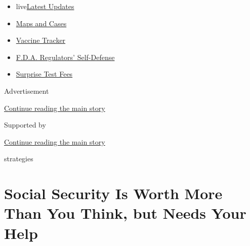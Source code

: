 \begin{itemize}
\tightlist
\item
  live\href{https://www.nytimes3xbfgragh.onion/2020/09/12/world/covid-19-coronavirus.html?name=styln-coronavirus-markets\&region=TOP_BANNER\&block=storyline_menu_recirc\&action=click\&pgtype=Article\&impression_id=034776d0-f52d-11ea-85d5-a5147cba864a\&variant=undefined}{Latest
  Updates}
\item
  \href{https://www.nytimes3xbfgragh.onion/interactive/2020/us/coronavirus-us-cases.html?name=styln-coronavirus-markets\&region=TOP_BANNER\&block=storyline_menu_recirc\&action=click\&pgtype=Article\&impression_id=034776d1-f52d-11ea-85d5-a5147cba864a\&variant=undefined}{Maps
  and Cases}
\item
  \href{https://www.nytimes3xbfgragh.onion/interactive/2020/science/coronavirus-vaccine-tracker.html?name=styln-coronavirus-markets\&region=TOP_BANNER\&block=storyline_menu_recirc\&action=click\&pgtype=Article\&impression_id=034776d2-f52d-11ea-85d5-a5147cba864a\&variant=undefined}{Vaccine
  Tracker}
\item
  \href{https://www.nytimes3xbfgragh.onion/2020/09/10/us/politics/fda-coronavirus-vaccine.html?name=styln-coronavirus-markets\&region=TOP_BANNER\&block=storyline_menu_recirc\&action=click\&pgtype=Article\&impression_id=034776d3-f52d-11ea-85d5-a5147cba864a\&variant=undefined}{F.D.A.
  Regulators' Self-Defense}
\item
  \href{https://www.nytimes3xbfgragh.onion/2020/09/09/upshot/coronavirus-surprise-test-fees.html?name=styln-coronavirus-markets\&region=TOP_BANNER\&block=storyline_menu_recirc\&action=click\&pgtype=Article\&impression_id=034776d4-f52d-11ea-85d5-a5147cba864a\&variant=undefined}{Surprise
  Test Fees}
\end{itemize}

Advertisement

\protect\hyperlink{after-top}{Continue reading the main story}

Supported by

\protect\hyperlink{after-sponsor}{Continue reading the main story}

strategies

\hypertarget{social-security-is-worth-more-than-you-think-but-needs-your-help}{%
\section{Social Security Is Worth More Than You Think, but Needs Your
Help}\label{social-security-is-worth-more-than-you-think-but-needs-your-help}}

